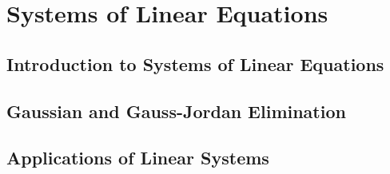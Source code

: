 \chapter{Systems of Linear Equations}
\section{Introduction to Systems of Linear Equations}

\newpage
\section{Gaussian and Gauss-Jordan Elimination}

\newpage
\section{Applications of Linear Systems}

